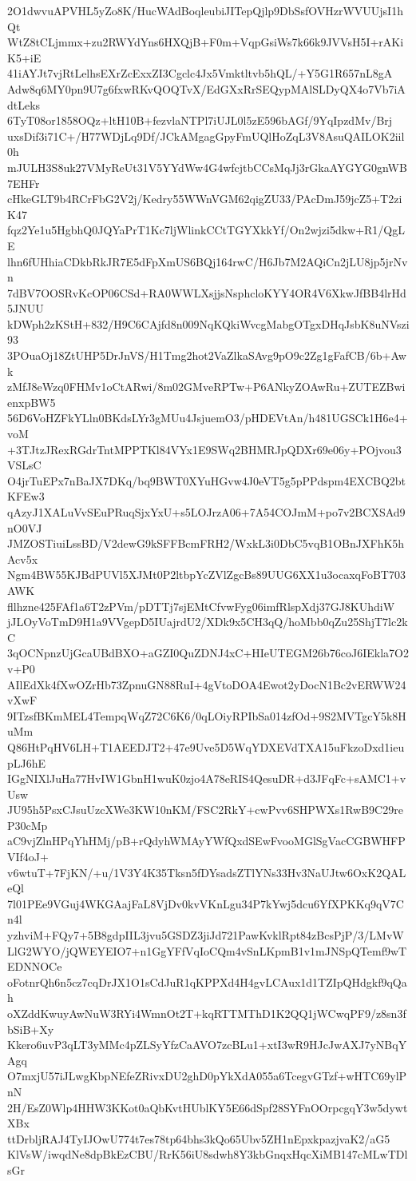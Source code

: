 2O1dwvuAPVHL5yZo8K/HucWAdBoqleubiJITepQjlp9DbSsfOVHzrWVUUjsI1hQt
WtZ8tCLjmmx+zu2RWYdYns6HXQjB+F0m+VqpGsiWs7k66k9JVVsH5I+rAKiK5+iE
41iAYJt7vjRtLelhsEXrZcExxZI3Cgclc4Jx5Vmktltvb5hQL/+Y5G1R657nL8gA
Adw8q6MY0pn9U7g6fxwRKvQOQTvX/EdGXxRrSEQypMAlSLDyQX4o7Vb7iAdtLeks
6TyT08or1858OQz+ltH10B+fezvlaNTPl7iUJL0l5zE596bAGf/9YqIpzdMv/Brj
uxsDif3i71C+/H77WDjLq9Df/JCkAMgagGpyFmUQlHoZqL3V8AsuQAILOK2iil0h
mJULH3S8uk27VMyReUt31V5YYdWw4G4wfcjtbCCsMqJj3rGkaAYGYG0gnWB7EHFr
cHkeGLT9b4RCrFbG2V2j/Kedry55WWnVGM62qigZU33/PAcDmJ59jcZ5+T2ziK47
fqz2Ye1u5HgbhQ0JQYaPrT1Kc7ljWlinkCCtTGYXkkYf/On2wjzi5dkw+R1/QgLE
lhn6fUHhiaCDkbRkJR7E5dFpXmUS6BQj164rwC/H6Jb7M2AQiCn2jLU8jp5jrNvn
7dBV7OOSRvKcOP06CSd+RA0WWLXsjjsNsphcloKYY4OR4V6XkwJfBB4lrHd5JNUU
kDWph2zKStH+832/H9C6CAjfd8n009NqKQkiWvcgMabgOTgxDHqJsbK8uNVszi93
3POuaOj18ZtUHP5DrJnVS/H1Tmg2hot2VaZlkaSAvg9pO9c2Zg1gFafCB/6b+Awk
zMfJ8eWzq0FHMv1oCtARwi/8m02GMveRPTw+P6ANkyZOAwRu+ZUTEZBwienxpBW5
56D6VoHZFkYLln0BKdsLYr3gMUu4JsjuemO3/pHDEVtAn/h481UGSCk1H6e4+voM
+3TJtzJRexRGdrTntMPPTKl84VYx1E9SWq2BHMRJpQDXr69e06y+POjvou3VSLsC
O4jrTuEPx7nBaJX7DKq/bq9BWT0XYuHGvw4J0eVT5g5pPPdspm4EXCBQ2btKFEw3
qAzyJ1XALuVvSEuPRuqSjxYxU+s5LOJrzA06+7A54COJmM+po7v2BCXSAd9nO0VJ
JMZOSTiuiLssBD/V2dewG9kSFFBcmFRH2/WxkL3i0DbC5vqB1OBnJXFhK5hAcv5x
Ngm4BW55KJBdPUVl5XJMt0P2ltbpYcZVlZgcBs89UUG6XX1u3ocaxqFoBT703AWK
fllhzne425FAf1a6T2zPVm/pDTTj7sjEMtCfvwFyg06imfRlspXdj37GJ8KUhdiW
jJLOyVoTmD9H1a9VVgepD5IUajrdU2/XDk9x5CH3qQ/hoMbb0qZu25ShjT7lc2kC
3qOCNpnzUjGcaUBdBXO+aGZI0QuZDNJ4xC+HIeUTEGM26b76coJ6IEkla7O2v+P0
AIlEdXk4fXwOZrHb73ZpnuGN88RuI+4gVtoDOA4Ewot2yDocN1Bc2vERWW24vXwF
9ITzsfBKmMEL4TempqWqZ72C6K6/0qLOiyRPIbSa014zfOd+9S2MVTgcY5k8HuMm
Q86HtPqHV6LH+T1AEEDJT2+47e9Uve5D5WqYDXEVdTXA15uFkzoDxd1ieupLJ6hE
IGgNIXlJuHa77HvIW1GbnH1wuK0zjo4A78eRIS4QesuDR+d3JFqFc+sAMC1+vUsw
JU95h5PsxCJsuUzcXWe3KW10nKM/FSC2RkY+cwPvv6SHPWXs1RwB9C29reP30cMp
aC9vjZlnHPqYhHMj/pB+rQdyhWMAyYWfQxdSEwFvooMGlSgVacCGBWHFPVIf4oJ+
v6wtuT+7FjKN/+u/1V3Y4K35Tksn5fDYsadsZTlYNs33Hv3NaUJtw6OxK2QALeQl
7l01PEe9VGuj4WKGAajFaL8VjDv0kvVKnLgu34P7kYwj5dcu6YfXPKKq9qV7Cn4l
yzhviM+FQy7+5B8gdpIIL3jvu5GSDZ3jiJd721PawKvklRpt84zBcsPjP/3/LMvW
LlG2WYO/jQWEYEIO7+n1GgYFfVqIoCQm4vSnLKpmB1v1mJNSpQTemf9wTEDNNOCe
oFotnrQh6n5cz7cqDrJX1O1sCdJuR1qKPPXd4H4gvLCAux1d1TZIpQHdgkf9qQah
oXZddKwuyAwNuW3RYi4WmnOt2T+kqRTTMThD1K2QQ1jWCwqPF9/z8sn3fbSiB+Xy
Kkero6uvP3qLT3yMMc4pZLSyYfzCaAVO7zcBLu1+xtI3wR9HJcJwAXJ7yNBqYAgq
O7mxjU57iJLwgKbpNEfeZRivxDU2ghD0pYkXdA055a6TcegvGTzf+wHTC69ylPnN
2H/EsZ0Wlp4HHW3KKot0aQbKvtHUblKY5E66dSpf28SYFnOOrpcgqY3w5dywtXBx
ttDrbljRAJ4TyIJOwU774t7es78tp64bhs3kQo65Ubv5ZH1nEpxkpazjvaK2/aG5
KlVsW/iwqdNe8dpBkEzCBU/RrK56iU8sdwh8Y3kbGnqxHqcXiMB147cMLwTDlsGr
